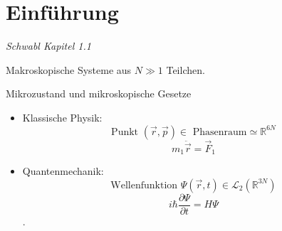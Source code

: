 \documentclass[11pt]{article}
\theoremstyle{plain}
\theoremstyle{mytheoremstyle}
\newcommand{\R}{\mathbb{R}}
\newcommand{\pd}[2]{\frac{\partial #1 }{\partial #2}}
\begin{document}
\section{Einf\"uhrung}
\emph{Schwabl Kapitel 1.1} \\
\begin{description}
  \item Makroskopische Systeme aus $N \gg 1$ Teilchen.
  \item Mikrozustand und mikroskopische Gesetze
    \begin{itemize}
      \item Klassische Physik: 
        \[\text{Punkt } (\vec{r}, \vec{p}) \in \text{ Phasenraum} \simeq \R^{6N} \]
        \[ m_1 \ddot{\vec{r}} = \vec{F}_1 \]
      \item Quantenmechanik: 
        \[ \text{Wellenfunktion } \Psi (\vec{r},t) \in \mathcal {L}_2 (\R^{3N}) \]
        \[ i \hbar \pd{\Psi}{t}= H \Psi \]. 
    \end{itemize}
    

\end{description}
\end{document}
